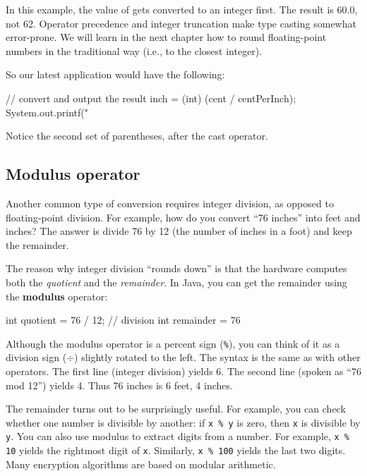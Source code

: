 In this example, the value of  gets converted to an integer first.
The result is 60.0, not 62.
Operator precedence and integer truncation make type casting somewhat error-prone.
We will learn in the next chapter how to round floating-point numbers in the traditional way (i.e., to the closest integer).

So our latest application would have the following:

\begin{code}
    // convert and output the result
    inch = (int) (cent / centPerInch);
    System.out.printf("%
\end{code}

Notice the second set of parentheses, after the cast operator.

\subsection{Modulus operator}

Another common type of conversion requires integer division, as opposed to floating-point division.
For example, how do you convert ``76 inches'' into feet and inches?
The answer is divide 76 by 12 (the number of inches in a foot) and keep the remainder.


The reason why integer division ``rounds down'' is that the hardware computes both the {\em quotient} and the {\em remainder}.
In Java, you can get the remainder using the {\bf modulus} operator:

\begin{code}
    int quotient = 76 / 12;   // division
    int remainder = 76 %
\end{code}

Although the modulus operator is a percent sign ({\tt \%}), you can think of it as a division sign ($\div$) slightly rotated to the left.
The syntax is the same as with other operators.
The first line (integer division) yields 6.
The second line (spoken as ``76 mod 12'') yields 4.
Thus 76 inches is 6 feet, 4 inches.


The remainder turns out to be surprisingly useful.
For example, you can check whether one number is divisible by another: if {\tt x \% y} is zero, then {\tt x} is divisible by {\tt y}.
You can also use modulus to extract digits from a number.
For example, {\tt x \% 10} yields the rightmost digit of {\tt x}.
Similarly, {\tt x \% 100} yields the last two digits.
Many encryption algorithms are based on modular arithmetic.


